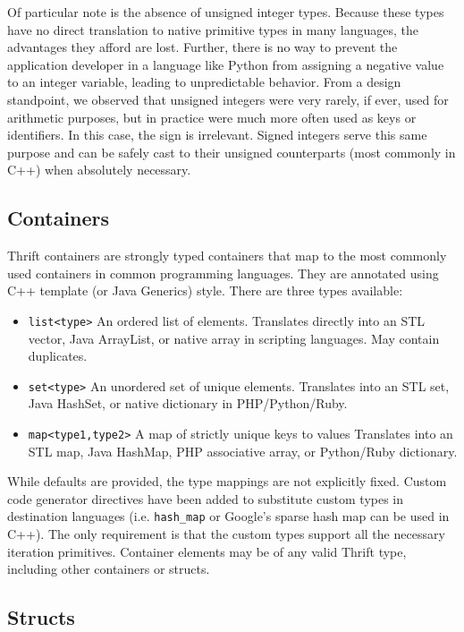 \documentclass[nocopyrightspace,blockstyle]{sigplanconf}
\begin{document}
Of particular note is the absence of unsigned integer types. Because these
types have no direct translation to native primitive types in many languages,
the advantages they afford are lost. Further, there is no way to prevent the
application developer in a language like Python from assigning a negative value
to an integer variable, leading to unpredictable behavior. From a design
standpoint, we observed that unsigned integers were very rarely, if ever, used
for arithmetic purposes, but in practice were much more often used as keys or
identifiers. In this case, the sign is irrelevant. Signed integers serve this
same purpose and can be safely cast to their unsigned counterparts (most
commonly in C++) when absolutely necessary.

\subsection{Containers}

Thrift containers are strongly typed containers that map to the most commonly
used containers in common programming languages. They are annotated using
C++ template (or Java Generics) style. There are three types available:
\begin{itemize}
\item \texttt{list<type>} An ordered list of elements. Translates directly into
an STL vector, Java ArrayList, or native array in scripting languages. May
contain duplicates.
\item \texttt{set<type>} An unordered set of unique elements. Translates into
an STL set, Java HashSet, or native dictionary in PHP/Python/Ruby. 
\item \texttt{map<type1,type2>} A map of strictly unique keys to values
Translates into an STL map, Java HashMap, PHP associative array,
or Python/Ruby dictionary.
\end{itemize}

While defaults are provided, the type mappings are not explicitly fixed. Custom
code generator directives have been added to substitute custom types in
destination languages (i.e.
\texttt{hash\_map} or Google's sparse hash map can be used in C++). The
only requirement is that the custom types support all the necessary iteration
primitives. Container elements may be of any valid Thrift type, including other
containers or structs.

\subsection{Structs}
\end{document}
